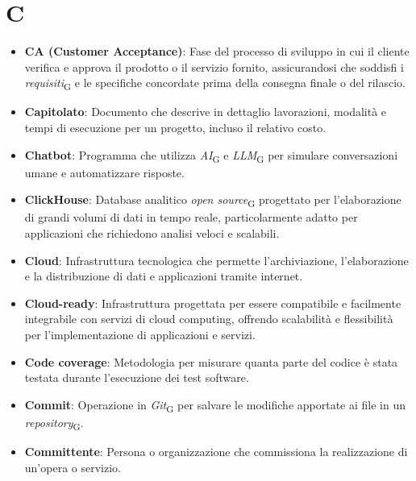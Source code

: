 \section*{C}  
\begin{itemize}
    \item \textbf{CA (Customer Acceptance)}: Fase del processo di sviluppo in cui il cliente verifica e approva il prodotto o il servizio fornito, assicurandosi che soddisfi i \textit{requisiti}\textsubscript{G} e le specifiche concordate prima della consegna finale o del rilascio.
    \item \textbf{Capitolato}: Documento che descrive in dettaglio lavorazioni, modalità e tempi di esecuzione per un progetto, incluso il relativo costo.
    \item \textbf{Chatbot}: Programma che utilizza \textit{AI}\textsubscript{G} e \textit{LLM}\textsubscript{G} per simulare conversazioni umane e automatizzare risposte.
    \item \textbf{ClickHouse}: Database analitico \textit{open source}\textsubscript{G} progettato per l'elaborazione di grandi volumi di dati in tempo reale, particolarmente adatto per applicazioni che richiedono analisi veloci e scalabili.
    \item \textbf{Cloud}: Infrastruttura tecnologica che permette l'archiviazione, l'elaborazione e la distribuzione di dati e applicazioni tramite internet.
    \item \textbf{Cloud-ready}: Infrastruttura progettata per essere compatibile e facilmente integrabile con servizi di cloud computing, offrendo scalabilità e flessibilità per l'implementazione di applicazioni e servizi.
    \item \textbf{Code coverage}: Metodologia per misurare quanta parte del codice è stata testata durante l'esecuzione dei test software.
    \item \textbf{Commit}: Operazione in \textit{Git}\textsubscript{G} per salvare le modifiche apportate ai file in un \textit{repository}\textsubscript{G}.
    \item \textbf{Committente}: Persona o organizzazione che commissiona la realizzazione di un'opera o servizio.

\end{itemize}
